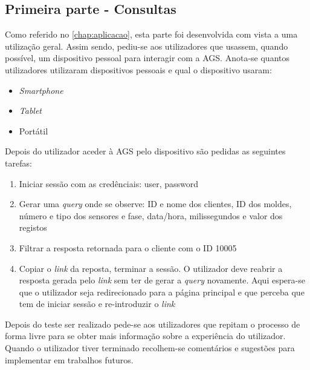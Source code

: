 \documentclass[11pt,twoside,a4paper]{report}
\begin{document}
\subsection{Primeira parte - Consultas}
Como referido no \autoref{chap:aplicacao}, esta parte foi desenvolvida com vista a uma utilização geral. Assim sendo, pediu-se aos utilizadores que usassem, quando possível, um dispositivo pessoal para interagir com a AGS. Anota-se quantos utilizadores utilizaram dispositivos pessoais e qual o dispositivo usaram:
\begin{itemize}
	\item \textit{Smartphone}
	\item \textit{Tablet}
	\item Portátil
\end{itemize}
Depois do utilizador aceder à AGS pelo dispositivo são pedidas as seguintes tarefas:
\begin{enumerate}
	\item Iniciar sessão com as credênciais: user, password
	\item Gerar uma \textit{query} onde se observe: ID e nome dos clientes, ID dos moldes, número e tipo dos sensores e fase, data/hora, milissegundos e valor dos registos
	\item Filtrar a resposta retornada para o cliente com o ID 10005
	\item Copiar o \textit{link} da reposta, terminar a sessão. O utilizador deve reabrir a resposta gerada pelo \textit{link} sem ter de gerar a \textit{query} novamente. Aqui espera-se que o utilizador seja redirecionado para a página principal e que perceba que tem de iniciar sessão e re-introduzir o \textit{link}
\end{enumerate}
Depois do teste ser realizado pede-se aos utilizadores que repitam o processo de forma livre para se obter mais informação sobre a experiência do utilizador. Quando o utilizador tiver terminado recolhem-se comentários e sugestões para implementar em trabalhos futuros.
\end{document}
